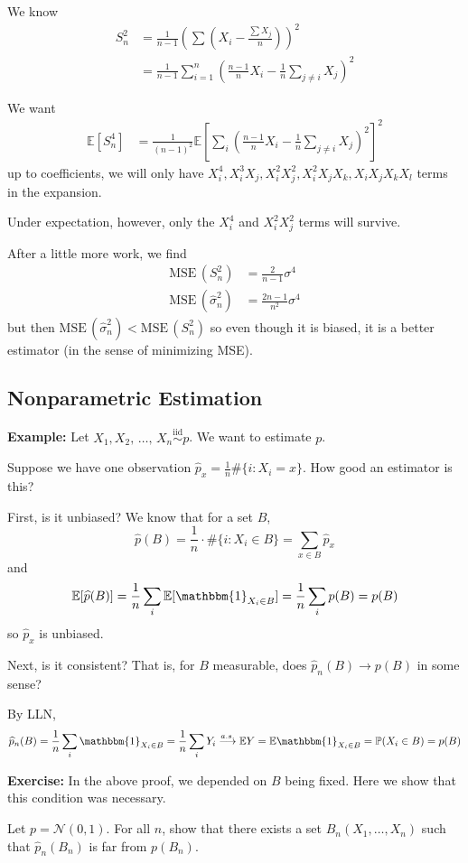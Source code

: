 \documentclass[12pt]{report}
\renewcommand{\hat}[1]{\widehat{#1}}
\renewcommand{\P}{\mathbb{P}}
\newcommand{\E}{\mathbb{E}}
\newcommand{\ind}{\mathbbm{1}}
\newcommand{\Nc}{\mathcal{N}}
\newcommand{\iid}{\overset{\text{iid}}{\sim}}
\newcommand*{\tbf}[1]{\ifmmode\mathbf{#1}\else\textbf{#1}\fi}
\newcommand{\MSE}{\text{MSE}\,}
\newenvironment*{exercise}[1][red]{
    \begin{tcolorbox}[
        parbox=false,
        colback=#1!5!white,
        colframe=#1!75!black,
        breakable
    ]}
    {\end{tcolorbox}}
\begin{document}
We know
\begin{align*}
	S_n^2 & = \frac{1}{n-1} \left(\sum (X_i - \frac{\sum X_j}{n})\right)^2                                 \\
	      & = \frac{1}{n-1} \sum_{i=1}^n \left(\frac{n-1}{n} X_i - \frac{1}{n} \sum_{j\neq i} X_j\right)^2
\end{align*}

We want
\begin{align*}
	\E[S_n^4] & = \frac{1}{(n-1)^2} \E\left[\sum_i \left(\frac{n-1}{n} X_i - \frac{1}{n} \sum_{j\neq i} X_j\right)^2\right]^2
\end{align*}
up to coefficients, we will only have $X_i^4, X_i^3X_j, X_i^2X_j^2, X_i^2X_jX_k, X_iX_jX_kX_l$ terms in the expansion.

Under expectation, however, only the $X_i^4$ and $X_i^2 X_j^2$ terms will survive.

After a little more work, we find
\begin{align*}
	\MSE(S_n^2)           & = \frac{2}{n -1} \sigma^4  \\
	\MSE(\hat \sigma_n^2) & = \frac{2n-1}{n^2}\sigma^4
\end{align*}
but then $\MSE(\hat \sigma_n^2) < \MSE(S_n^2)$ so even though it is biased, it is a better estimator (in the sense of minimizing MSE).

\subsection{Nonparametric Estimation}
\tbf{Example:} Let $X_1, X_2, \, \dots,\, X_n \iid p$. We want to estimate $p$.

Suppose we have one observation $\hat p_x = \frac{1}{n} \#\{i: X_i = x\}$. How good an estimator is this?

First, is it unbiased? We know that for a set $B$,
\[\hat p(B) = \frac{1}{n}\cdot \#\{i: X_i \in B\} = \sum_{x \in B} \hat p_x\]
and
\[\E[\hat p(B)] = \frac{1}{n} \sum_i \E[\ind_{X_i \in B}] = \frac{1}{n} \sum_i p(B) = p(B)\]
so $\hat p_x$ is unbiased.

Next, is it consistent? That is, for $B$ measurable, does $\hat p_n(B) \to p(B)$ in some sense?

By LLN,
\[\hat p_n(B) = \frac{1}{n} \sum_i \ind_{X_i \in B} = \frac{1}{n} \sum_i Y_i \overset{a.s.}{\longrightarrow}\E Y = \E \ind_{X_i \in B} = \P(X_i \in B) = p(B)\]

\begin{exercise}
	\textbf{Exercise:} In the above proof, we depended on $B$ being fixed. Here we show that this condition was necessary.

	Let $p = \Nc(0, 1)$. For all $n$, show that there exists a set $B_n(X_1, \dots, X_n)$ such that $\hat p_n(B_n)$ is far from $p(B_n)$.
\end{exercise}
\end{document}
